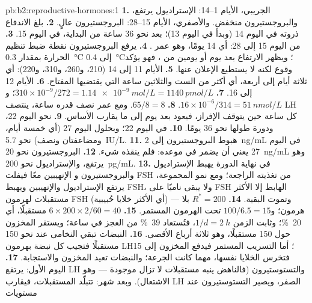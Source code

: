 \begin{solution}{pb:b2:reproductive-hormones:1}
\textbf{1.} الجريبي، الأيام 1--14: الإستراديول يرتفع، والبروجستيرون
منخفض. والأصفري، الأيام 15--28: البروجستيرون عالٍ.
\textbf{2.} بلغ الاندفاع ذروته في اليوم 14 (وبدأ في اليوم 13)؛
 بعد نحو 36 ساعة من البداية، في اليوم 15.
\textbf{3.} من اليوم 15 إلى 28: أي 14 يومًا، وهو عمر .
\textbf{4.} يرفع البروجستيرون نقطة ضبط تنظيم الحرارة بمقدار
\qty{0.3}{\celsius} إلى \qty{0.4}{\celsius}؛ ويظهر الارتفاع بعد يوم
أو يومين من ، فهو يؤكد وقوع  لكنه
لا يستطيع الإعلان عنها.
\textbf{5.} الأيام 11 إلى 14 (210، و260، و310، و220): أي ثلاثة أيام إلى أربعة،
أي أكثر من الست والثلاثين ساعة التي يقتضيها المفتاح.
\textbf{6.} الأيام 12 إلى 16.
\textbf{7.} $310\times 10^{-9}/272 = \qty{1.14e-9}{mol/L} =
\qty{1140}{pmol/L}$؛ و$16\times 10^{-6}/314 = \qty{51}{nmol/L}$.
\textbf{8.} $65/8 = 8$. ومع عمر نصف قدره ساعة، ينتصف LH كل
ساعة حين يتوقف الإفراز، فيعود بعد يوم إلى ما يقارب الأساس.
\textbf{9.}  نحو اليوم 22، ودورة طولها نحو 36 يومًا.
\textbf{10.}  في اليوم 22؛ وبحلول اليوم 27 (أي خمسة أيام، ومضاعفتان
ونصف) نحو \qty{5.7}{IU/L}.
\textbf{11.} هبوط البروجستيرون إلى \qty{2}{ng/mL} في اليوم 27 يعني
أن  يضمر في موعده: فلم ينقذه شيء.
\textbf{12.} البروجستيرون نحو \qty{20}{ng/mL} وهو يرتفع،
والإستراديول نحو \qty{200}{pg/mL}.
\textbf{13.} في نهاية الدورة يهبط الإستراديول والبروجستيرون و
الإنهيبين معًا فيفلت FSH من تغذيته الراجعة؛ ومع نمو المجموعة،
يرتفع الإستراديول والإنهيبين ويهبط FSH، ولا يبقى ناميًا على FSH
الهابط إلا  الأكثر مستقبلات لهرمون FSH (أي الأكثر خلايا حُبيبية)
--- وتموت البقية.
\textbf{14.} $R^* = 200$ بلا هرمون؛ و$100/6.5 = 15$ تحت
الهرمون المستمر.
\textbf{15.} $6\times 200\times 2/60 = 40$ مستقبلًا، أي \qty{20}{\%}؛
وثابت الزمن $1/d = \qty{2}{h}$، فتُستعاد \qty{39}{\%} من العجز
في ساعة؛ ويستقر المخزون حول 150 مستقبلًا، وهو ثلاثة
أرباع الأقصى.
\textbf{16.} النبضات تبقي النخامى عند نحو 150 مستقبلًا فتجيب
كل نبضة بهرمون LH؛ أما التسريب المستمر فيدفع المخزون إلى
15 فتخرس الخلايا نفسها، مهما كانت الجرعة؛ والنبضات تعيد
المخزون والاستجابة.
\textbf{17.} اليوم الأول: يرتفع LH والتستوستيرون (فالناهض
ينبه مستقبلات لا تزال موجودة --- وهو الاشتعال). وبعد شهر:
تتبلّد المستقبلات، فيقارب LH الصفر، ويصير التستوستيرون عند مستويات

\end{solution}
